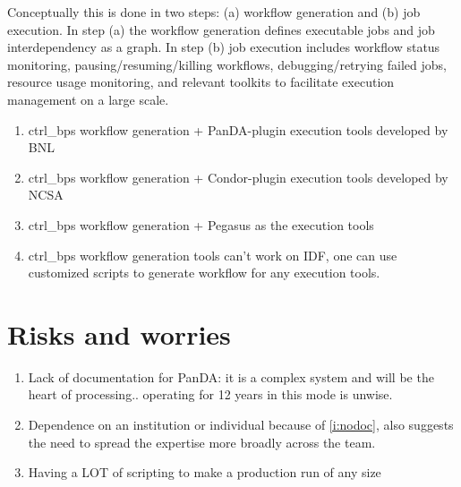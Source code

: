 Conceptually this is done in two steps: (a) workflow generation and (b) job execution.
In step (a) the workflow generation defines executable jobs and job interdependency as a graph.
In step (b) job execution includes workflow status monitoring, pausing/resuming/killing workflows, debugging/retrying failed jobs, resource usage monitoring, and relevant toolkits to facilitate execution management on a large scale.
\begin{enumerate}
\item  ctrl\_bps workflow generation + PanDA-plugin execution tools developed by BNL
\item ctrl\_bps workflow generation + Condor-plugin execution tools developed by NCSA
\item ctrl\_bps workflow generation + Pegasus as the execution tools
\item ctrl\_bps workflow generation tools can't work on IDF, one can use customized scripts to generate workflow for any execution tools.
\end{enumerate}



\section {Risks and worries}

\begin{enumerate}
\item Lack of documentation for PanDA: it is a complex system and will
  be the heart of processing.. operating for 12 years in this mode is unwise.\label{i:nodoc}
\item Dependence on an institution or individual because of
  \ref{i:nodoc}, also suggests the need to spread the expertise more
  broadly across the team.
\item Having a LOT of scripting to make a production run of any size
\end{enumerate}
